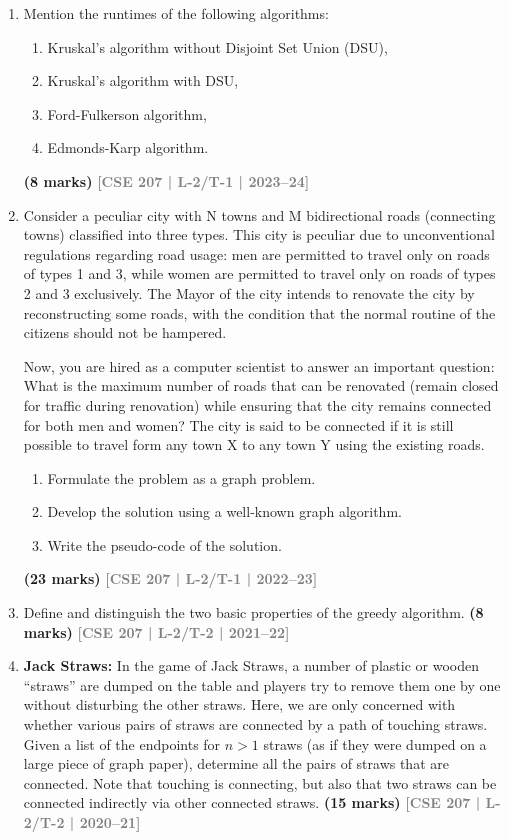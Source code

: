 \documentclass[12pt]{article}
\newcommand{\yr}[1]{\hfill\textcolor{gray}{\small\textbf{[#1]}}}
\newcommand{\mk}[1]{\textcolor{orange!70!black}{\small\textbf{(#1 marks)}}}
\begin{document}
\begin{enumerate}
\item Mention the runtimes of the following algorithms:
\begin{enumerate}
\item  Kruskal's algorithm without Disjoint Set Union (DSU), 
\item  Kruskal's algorithm with DSU, 
\item  Ford-Fulkerson algorithm, 
\item  Edmonds-Karp algorithm.
\end{enumerate}
\mk{8} \yr{CSE 207 | L-2/T-1 | 2023--24}


\item Consider a peculiar city with N towns and M bidirectional roads (connecting towns) 
    classified into three types. This city is peculiar due to unconventional regulations 
    regarding road usage: men are permitted to travel only on roads of types 1 and 3, while 
    women are permitted to travel only on roads of types 2 and 3 exclusively. The Mayor 
    of the city intends to renovate the city by reconstructing some roads, with the condition 
    that the normal routine of the citizens should not be hampered.
    
    Now, you are hired as a computer scientist to answer an important question: What is 
    the maximum number of roads that can be renovated (remain closed for traffic during 
    renovation) while ensuring that the city remains connected for both men and women? 
    The city is said to be connected if it is still possible to travel form any town X to any 
    town Y using the existing roads.
\begin{enumerate}
  \item Formulate the problem as a graph problem.
  \item Develop the solution using a well-known graph algorithm.
  \item Write the pseudo-code of the solution.
\end{enumerate}
\mk{23} \yr{CSE 207 | L-2/T-1 | 2022--23}


\item Define and distinguish the two basic properties of the greedy algorithm.
\mk{8} \yr{CSE 207 | L-2/T-2 | 2021--22}


\item \textbf{Jack Straws:} In the game of Jack Straws, a number of plastic or wooden ``straws'' are dumped on the table and players try to remove them one by one without disturbing the other straws. Here, we are only concerned with whether various pairs of straws are connected by a path of touching straws. Given a list of the endpoints for $n > 1$ straws (as if they were dumped on a large piece of graph paper), determine all the pairs of straws that are connected. Note that touching is connecting, but also that two straws can be connected indirectly via other connected straws.
\mk{15} \yr{CSE 207 | L-2/T-2 | 2020--21}



\end{enumerate}
\end{document}
